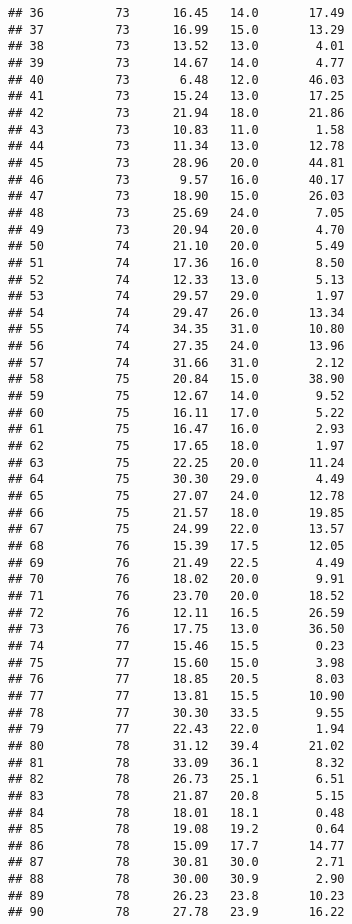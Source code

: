 \documentclass[
]{article}
\begin{document}
\begin{verbatim}
## 36          73      16.45   14.0       17.49
## 37          73      16.99   15.0       13.29
## 38          73      13.52   13.0        4.01
## 39          73      14.67   14.0        4.77
## 40          73       6.48   12.0       46.03
## 41          73      15.24   13.0       17.25
## 42          73      21.94   18.0       21.86
## 43          73      10.83   11.0        1.58
## 44          73      11.34   13.0       12.78
## 45          73      28.96   20.0       44.81
## 46          73       9.57   16.0       40.17
## 47          73      18.90   15.0       26.03
## 48          73      25.69   24.0        7.05
## 49          73      20.94   20.0        4.70
## 50          74      21.10   20.0        5.49
## 51          74      17.36   16.0        8.50
## 52          74      12.33   13.0        5.13
## 53          74      29.57   29.0        1.97
## 54          74      29.47   26.0       13.34
## 55          74      34.35   31.0       10.80
## 56          74      27.35   24.0       13.96
## 57          74      31.66   31.0        2.12
## 58          75      20.84   15.0       38.90
## 59          75      12.67   14.0        9.52
## 60          75      16.11   17.0        5.22
## 61          75      16.47   16.0        2.93
## 62          75      17.65   18.0        1.97
## 63          75      22.25   20.0       11.24
## 64          75      30.30   29.0        4.49
## 65          75      27.07   24.0       12.78
## 66          75      21.57   18.0       19.85
## 67          75      24.99   22.0       13.57
## 68          76      15.39   17.5       12.05
## 69          76      21.49   22.5        4.49
## 70          76      18.02   20.0        9.91
## 71          76      23.70   20.0       18.52
## 72          76      12.11   16.5       26.59
## 73          76      17.75   13.0       36.50
## 74          77      15.46   15.5        0.23
## 75          77      15.60   15.0        3.98
## 76          77      18.85   20.5        8.03
## 77          77      13.81   15.5       10.90
## 78          77      30.30   33.5        9.55
## 79          77      22.43   22.0        1.94
## 80          78      31.12   39.4       21.02
## 81          78      33.09   36.1        8.32
## 82          78      26.73   25.1        6.51
## 83          78      21.87   20.8        5.15
## 84          78      18.01   18.1        0.48
## 85          78      19.08   19.2        0.64
## 86          78      15.09   17.7       14.77
## 87          78      30.81   30.0        2.71
## 88          78      30.00   30.9        2.90
## 89          78      26.23   23.8       10.23
## 90          78      27.78   23.9       16.22

\end{verbatim}
\end{document}
